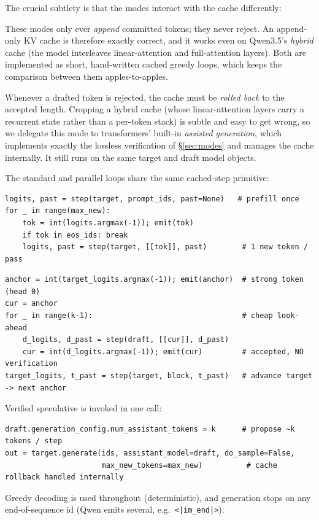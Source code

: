 \documentclass[11pt]{article}
\begin{document}
The crucial subtlety is that the modes interact with the cache differently:
\begin{description}[style=nextline,leftmargin=1.5em]
  \item[Standard and parallel --- append-only.] These modes only ever
        \emph{append} committed tokens; they never reject. An append-only KV
        cache is therefore exactly correct, and it works even on Qwen3.5's
        \emph{hybrid} cache (the model interleaves linear-attention and
        full-attention layers). Both are implemented as short, hand-written
        cached greedy loops, which keeps the comparison between them
        apples-to-apples.
  \item[Verified speculative --- requires rollback.] Whenever a drafted token is
        rejected, the cache must be \emph{rolled back} to the accepted length.
        Cropping a hybrid cache (whose linear-attention layers carry a recurrent
        state rather than a per-token stack) is subtle and easy to get wrong, so
        we delegate this mode to transformers' built-in \emph{assisted
        generation}, which implements exactly the lossless verification of
        \S\ref{sec:modes} and manages the cache internally. It still runs on the
        same target and draft model objects.
\end{description}

The standard and parallel loops share the same cached-step primitive:
\begin{lstlisting}[caption={Standard greedy with an append-only KV cache.}]
logits, past = step(target, prompt_ids, past=None)   # prefill once
for _ in range(max_new):
    tok = int(logits.argmax(-1)); emit(tok)
    if tok in eos_ids: break
    logits, past = step(target, [[tok]], past)        # 1 new token / pass
\end{lstlisting}
\begin{lstlisting}[caption={Non-verification parallel (lossy): strong anchor + blind look-ahead.}]
anchor = int(target_logits.argmax(-1)); emit(anchor)  # strong token (head 0)
cur = anchor
for _ in range(k-1):                                  # cheap look-ahead
    d_logits, d_past = step(draft, [[cur]], d_past)
    cur = int(d_logits.argmax(-1)); emit(cur)         # accepted, NO verification
target_logits, t_past = step(target, block, t_past)   # advance target -> next anchor
\end{lstlisting}
Verified speculative is invoked in one call:
\begin{lstlisting}[caption={Verified speculative via HF assisted generation (lossless).}]
draft.generation_config.num_assistant_tokens = k      # propose ~k tokens / step
out = target.generate(ids, assistant_model=draft, do_sample=False,
                      max_new_tokens=max_new)          # cache rollback handled internally
\end{lstlisting}
Greedy decoding is used throughout (deterministic), and generation stops on any
end-of-sequence id (Qwen emits several, e.g.\ \texttt{<|im\_end|>}).
\end{document}

